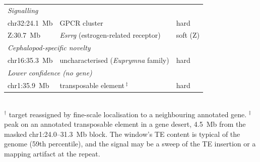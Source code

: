 \documentclass[11pt]{article}
\begin{document}
\begin{table}[t]
\begin{tabular}{lll}
    \multicolumn{3}{l}{\itshape Signalling}\\
    chr32:24.1~Mb & GPCR cluster                                          & hard \\
    Z:30.7~Mb     & \textit{Esrrg} (estrogen-related receptor)            & soft (Z) \\
    \multicolumn{3}{l}{\itshape Cephalopod-specific novelty}\\
    chr16:35.3~Mb & uncharacterised (\textit{Euprymna} family)            & hard \\
    \multicolumn{3}{l}{\itshape Lower confidence (no gene)}\\
    chr1:35.9~Mb  & transposable element\,$^{\ddagger}$                   & hard \\
    \bottomrule
  \end{tabular}
  \\[2pt]
  {\footnotesize $^{\dagger}$ target reassigned by fine-scale localisation to a neighbouring annotated gene.
   $^{\ddagger}$ peak on an annotated transposable element in a gene desert, 4.5~Mb from the masked chr1:24.0--31.3~Mb block. The window's TE content is typical of the genome (59th percentile), and the signal may be a sweep of the TE insertion or a mapping artifact at the repeat.}
\end{table}

\end{document}
